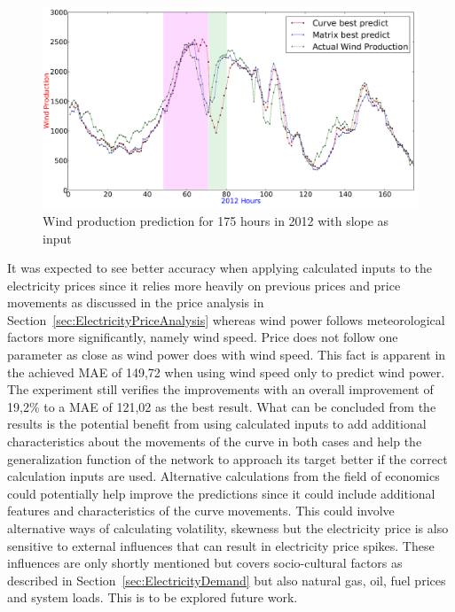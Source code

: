 \begin{figure}[H]
\centering
\includegraphics[width=0.99\linewidth]{billeder/curveAnalysisWindProduction.png}
\caption{Wind production prediction for 175 hours in 2012 with slope as input}
\label{fig:basicCurveAnalysisGraphoForDiscussion}
\end{figure}

It was expected to see better accuracy when applying calculated inputs to the electricity prices since it relies more heavily on previous prices and price movements as discussed in the price analysis in Section~\ref{sec:ElectricityPriceAnalysis} whereas wind power follows meteorological factors more significantly, namely wind speed. Price does not follow one parameter as close as wind power does with wind speed. This fact is apparent in the achieved MAE of 149,72 when using wind speed only to predict wind power. The experiment still verifies the improvements with an overall improvement of 19,2\% to a MAE of 121,02 as the best result. What can be concluded from the results is the potential benefit from using calculated inputs to add additional characteristics about the movements of the curve in both cases and help the generalization function of the network to approach its target better if the correct calculation inputs are used. Alternative calculations from the field of economics could potentially help improve the predictions since it could include additional features and characteristics of the curve movements. This could involve alternative ways of calculating volatility, skewness but the electricity price is also sensitive to external influences that can result in electricity price spikes\cite{singhal2011electricity}. These influences are only shortly mentioned but covers socio-cultural factors as described in Section~\ref{sec:ElectricityDemand} but also natural gas, oil, fuel prices and system loads\cite{singhal2011electricity}. This is to be explored future work. 